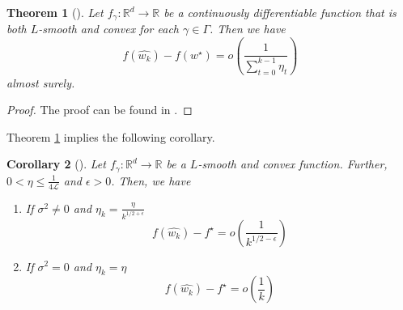 \documentclass[12pt]{article}
\newtheorem{theorem}{Theorem}[section]
\newtheorem{corollary}[theorem]{Corollary}
\theoremstyle{definition}
\newtheorem{assumption}[assumption]{Assumption}
\numberwithin{equation}{section}
\newcommand{\R}{\mathbb{R}}
\newcommand{\CL}{\mathcal{L}}
\begin{document}
\begin{theorem}[]
  \label{thm:almost_sure_convergence}
  Let $f_{\gamma} : \R^d \rightarrow \R$ be a continuously differentiable function that is both $L$-smooth and convex for each $\gamma \in \Gamma$. Then we have 
  \begin{equation*}
    f(\widehat{w_{k}}) - f(w^\star) = o\left(\frac{1}{\sum_{t=0}^{k-1}\eta_t}\right)
  \end{equation*}
  almost surely.
\end{theorem}
\begin{proof}
  The proof can be found in \autocite{sebbouhAlmostSureConvergence2021}.
\end{proof}
Theorem \ref{thm:almost_sure_convergence} implies the following corollary.
\begin{corollary}[]
  Let $f_{\gamma}: \R^d \rightarrow \R$ be a $L$-smooth and convex function. Further, $0 < \eta \leq \frac{1}{4\CL}$ and $\epsilon > 0 $. Then, we have
  \begin{enumerate}
    \item If $\sigma^2 \neq 0$ and $\eta_k = \frac{\eta}{k^{1/2+\epsilon}}$
    \begin{equation*}
      f(\widehat{w_{k}}) - f^\star = o\left(\frac{1}{k^{1/2-\epsilon}}\right)
    \end{equation*}
    \item If $\sigma^2 = 0$ and $\eta_k = \eta$
    \begin{equation*}
      f(\widehat{w_{k}}) - f^\star = o\left(\frac{1}{k}\right)
    \end{equation*}
  \end{enumerate}
\end{corollary}
\end{document}
